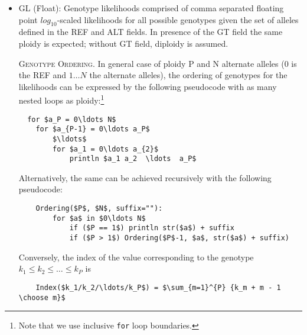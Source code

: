 \documentclass[8pt]{article}
\begin{document}
\begin{itemize}
  \item GL (Float): Genotype likelihoods comprised of comma separated floating point $log_{10}$-scaled likelihoods for all possible genotypes given the set of alleles defined in the REF and ALT fields. In presence of the GT field the same ploidy is expected; without GT field, diploidy is assumed.

  \textsc{Genotype Ordering.} In general case of ploidy P and N alternate alleles (0 is the REF and $1\ldots N$
  the alternate alleles), the ordering of genotypes for the likelihoods can
  be expressed by the following pseudocode with as many nested loops as ploidy:\footnote{Note that we use inclusive \texttt{for} loop boundaries.}
  \begingroup
  \small
  \begin{lstlisting}
  for $a_P = 0\ldots N$
    for $a_{P-1} = 0\ldots a_P$
        $\ldots$
        for $a_1 = 0\ldots a_{2}$
            println $a_1 a_2  \ldots  a_P$
  \end{lstlisting}
  \endgroup

  Alternatively, the same can be achieved recursively with the following pseudocode:
  \begingroup
  \small
  \begin{lstlisting}
    Ordering($P$, $N$, suffix=""):
        for $a$ in $0\ldots N$
            if ($P == 1$) println str($a$) + suffix
            if ($P > 1$) Ordering($P$-1, $a$, str($a$) + suffix)
  \end{lstlisting}
  \endgroup

  Conversely, the index of the value corresponding to the genotype $k_1\le k_2\le\ldots\le k_P$ is
  \begingroup
  \small
  \begin{lstlisting}
    Index($k_1/k_2/\ldots/k_P$) = $\sum_{m=1}^{P} {k_m + m - 1 \choose m}$
  \end{lstlisting}
  \endgroup


\end{itemize}
\end{document}
